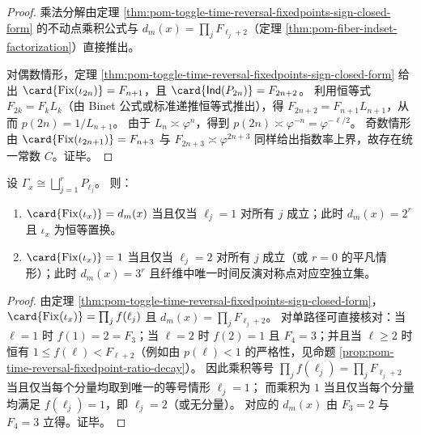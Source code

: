 \begin{proof}
乘法分解由定理 \ref{thm:pom-toggle-time-reversal-fixedpoints-sign-closed-form} 的不动点乘积公式与 \(d_m(x)=\prod_j F_{\ell_j+2}\)（定理 \ref{thm:pom-fiber-indset-factorization}）直接推出。
\par
对偶数情形，定理 \ref{thm:pom-toggle-time-reversal-fixedpoints-sign-closed-form} 给出
\(
\card{\mathrm{Fix}(\iota_{2n})}=F_{n+1}
\)，且 \(\card{\mathsf{Ind}(P_{2n})}=F_{2n+2}\)。
利用恒等式 \(F_{2k}=F_k L_k\)（由 Binet 公式或标准递推恒等式推出），得 \(F_{2n+2}=F_{n+1}L_{n+1}\)，从而 \(p(2n)=1/L_{n+1}\)。
由于 \(L_{n}\asymp \varphi^{n}\)，得到 \(p(2n)\asymp \varphi^{-n}=\varphi^{-\ell/2}\)。
奇数情形由 \(\card{\mathrm{Fix}(\iota_{2n+1})}=F_{n+3}\) 与 \(F_{2n+3}\asymp \varphi^{2n+3}\) 同样给出指数率上界，故存在统一常数 \(C\)。证毕。
\end{proof}

\begin{proposition}[时间反演定点数的两类极端情形]\label{prop:pom-time-reversal-fixedpoints-extremes}
设 \(\Gamma_x\cong\bigsqcup_{j=1}^r P_{\ell_j}\)。
则：
\begin{enumerate}
\normalfont
  \item \(\card{\mathrm{Fix}(\iota_x)}=d_m(x)\) 当且仅当 \(\ell_j=1\) 对所有 \(j\) 成立；此时 \(d_m(x)=2^{r}\) 且 \(\iota_x\) 为恒等置换。
  \item \(\card{\mathrm{Fix}(\iota_x)}=1\) 当且仅当 \(\ell_j=2\) 对所有 \(j\) 成立（或 \(r=0\) 的平凡情形）；此时 \(d_m(x)=3^{r}\) 且纤维中唯一时间反演对称点对应空独立集。
\end{enumerate}
\end{proposition}

\begin{proof}
由定理 \ref{thm:pom-toggle-time-reversal-fixedpoints-sign-closed-form}，
\(
\card{\mathrm{Fix}(\iota_x)}=\prod_j f(\ell_j)
\)
且
\(
d_m(x)=\prod_j F_{\ell_j+2}
\)。
对单路径可直接核对：当 \(\ell=1\) 时 \(f(1)=2=F_3\)；当 \(\ell=2\) 时 \(f(2)=1\) 且 \(F_4=3\)；并且当 \(\ell\ge 2\) 时恒有 \(1\le f(\ell)<F_{\ell+2}\)（例如由 \(p(\ell)<1\) 的严格性，见命题 \ref{prop:pom-time-reversal-fixedpoint-ratio-decay}）。
因此乘积等号 \(\prod_j f(\ell_j)=\prod_j F_{\ell_j+2}\) 当且仅当每个分量均取到唯一的等号情形 \(\ell_j=1\)；
而乘积为 \(1\) 当且仅当每个分量均满足 \(f(\ell_j)=1\)，即 \(\ell_j=2\)（或无分量）。
对应的 \(d_m(x)\) 由 \(F_3=2\) 与 \(F_4=3\) 立得。证毕。
\end{proof}

